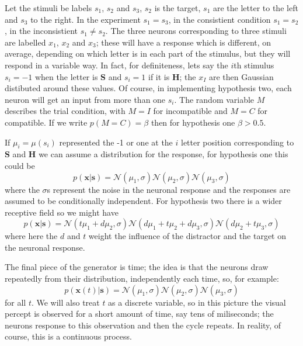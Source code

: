 \documentclass[12pt]{article}
\begin{document}
Let the stimuli be labels $s_1$, $s_2$ and $s_3$, $s_2$ is the target,
$s_1$ are the letter to the left and $s_3$ to the right. In the
experiment $s_1=s_3$, in the consistient condition $s_1=s_2$, in the
inconsistient $s_1\not=s_2$. The three neurons corresponding to three
stimuli are labelled $x_1$, $x_2$ and $x_3$; these will have a
response which is different, on average, depending on which letter is
in each part of the stimulus, but they will respond in a variable
way. In fact, for definiteness, lets say the $i$th stimulus $s_i=-1$
when the letter is \textbf{S} and $s_i=1$ if it is \textbf{H}; the
$x_I$ are then Gaussian distibuted around these values. Of course, in
implementing hypothesis two, each neuron will get an input from more
than one $s_i$. The random variable $M$ describes the trial condition,
with $M=I$ for incompatible and $M=C$ for compatible. If we write
$p(M=C)=\beta$ then for hypothesis one $\beta>0.5$.

If $\mu_i=\mu(s_i)$ represented the -1 or one at the $i$ letter
position corresponding to \textbf{S} and \textbf{H} we can assume a
distribution for the response, for hypothesis one this could be
\begin{equation}
p(\textbf{x}|\textbf{s})=\mathcal{N}(\mu_1,\sigma)\mathcal{N}(\mu_2,\sigma)\mathcal{N}(\mu_3,\sigma)
\end{equation}
where the $\sigma$s represent the noise in the neuronal response and the responses are assumed to be conditionally independent. For hypothesis two there is a wider receptive field so we might have
\begin{equation}
p(\textbf{x}|\textbf{s})=\mathcal{N}(t\mu_1+d\mu_2,\sigma)\mathcal{N}(d\mu_1+t\mu_2+d\mu_3,\sigma)\mathcal{N}(d\mu_2+t\mu_3,\sigma)
\end{equation}
where here the $d$ and $t$ weight the influence of the distractor and
the target on the neuronal response.

The final piece of the generator is time; the idea is that the neurons
draw repeatedly from their distribution, independently each time, so, for example:
\begin{equation}
p(\textbf{x}(t)|\textbf{s})=\mathcal{N}(\mu_1,\sigma)\mathcal{N}(\mu_2,\sigma)\mathcal{N}(\mu_3,\sigma)
\end{equation}
for all $t$. We will also treat $t$ as a discrete variable, so in this
picture the visual percept is observed for a short amount of time, say
tens of miliseconds; the neurons response to this observation and then
the cycle repeats. In reality, of course, this is a continuous
process.
\end{document}
